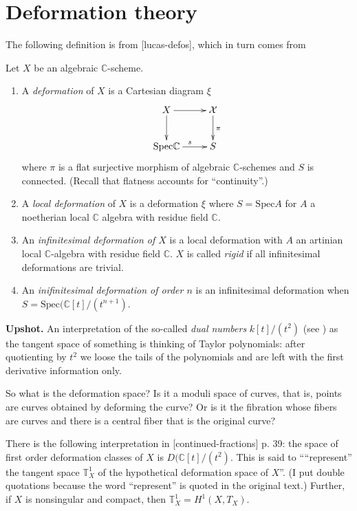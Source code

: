 \section{Deformation theory}
\label{section-deformation-theory}

The following definition is from [lucas-defos], which in turn comes from
\cite{Sernesi-deformations}

\begin{definition}
\label{definition-deformation}
Let $X$ be an algebraic $\mathbb{C}$-scheme.
\begin{enumerate}
\item A {\it deformation} of $X$ is a Cartesian diagram $\xi$
$$
\xymatrix{
X\ar[r]\ar[d]&\mathcal{X}\ar[d]^{\pi}\\
\text{Spec}\mathbb{C}\ar[r]^s&S
}
$$
where $\pi$ is a flat surjective morphism of algebraic $\mathbb{C}$-schemes and
$S$ is connected. (Recall that flatness accounts for ``continuity''.)
\item A {\it local deformation} of $X$ is a deformation $\xi$ where
$S=\text{Spec}A$ for $A$ a noetherian local $\mathbb{C}$ algebra with residue
field $\mathbb{C}$.
\item An {\it infinitesimal deformation of $X$} is a local deformation with $A$
an artinian local $\mathbb{C}$-algebra with residue field $\mathbb{C}$. $X$ is
called {\it rigid} if all infinitesimal deformations are trivial.
\item An {\it inifinitesimal deformation of order $n$} is an infinitesimal
deformation when $S=\text{Spec}(\mathbb{C}[t]/(t^{n+1})$.
\end{enumerate}
\end{definition}

{\bf Upshot.} An interpretation of the so-called {\it dual numbers}
$k[t]/(t^2)$ (see \cite{Hartshorne-deformation}) as the tangent space of
something is thinking of Taylor polynomials: after quotienting by $t^2$ we loose
the tails of the polynomials and are left with the first derivative information
only.

So what is the deformation space? Is it a moduli space of curves, that is,
points are curves obtained by deforming the curve? Or is it the fibration whose
fibers are curves and there is a central fiber that is the original curve?

There is the following interpretation in [continued-fractions] p. 39: the space
of first order deformation classes of $X$ is $D(\mathbb{C}[t]/(t^2)$. This is
said to ````represent'' the tangent space $\mathbb{T}^1_X$ of the hypothetical
deformation space of $X$''. (I put double quotations because the word
``represent'' is quoted in the original text.) Further, if $X$ is nonsingular
and compact, then $\mathbb{T}^1_X=H^{1}(X,T_X)$.

